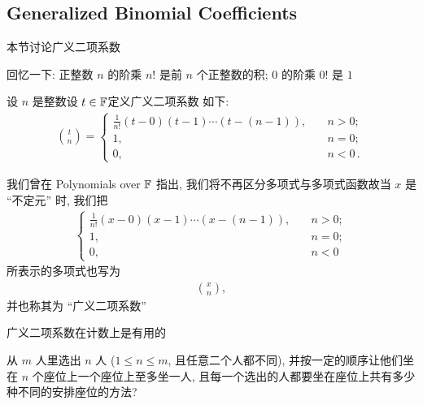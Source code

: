 \subsection*{Generalized Binomial Coefficients}

本节讨论广义二项系数\period

回忆一下: 正整数 $n$ 的阶乘 $n!$ 是前 $n$ 个正整数的积; $0$ 的阶乘 $0!$ 是 $1$\period

\begin{definition}
    设 $n$ 是整数\period 设 $t \in \mathbb{F}$\period 定义广义二项系数  如下:
    \begin{align*}
        \binom{t}{n} = \begin{cases}
            \frac{1}{n!} (t - 0)(t - 1) \cdots (t - (n - 1)), & \quad n > 0;        \\
            1,                                                & \quad n = 0;        \\
            0,                                                & \quad n < 0 \period
        \end{cases}
    \end{align*}
\end{definition}

\begin{remark}
    我们曾在 Polynomials over $\mathbb{F}$ 指出, 我们将不再区分多项式与多项式函数\period 故当 $x$ 是 ``不定元'' 时, 我们把
    \begin{align*}
        \begin{cases}
            \frac{1}{n!} (x - 0)(x - 1) \cdots (x - (n - 1)), & \quad n > 0; \\
            1,                                                & \quad n = 0; \\
            0,                                                & \quad n < 0
        \end{cases}
    \end{align*}
    所表示的多项式也写为
    \begin{align*}
        \binom{x}{n},
    \end{align*}
    并也称其为 ``广义二项系数''\period
\end{remark}

广义二项系数在计数上是有用的\period

从 $m$ 人里选出 $n$ 人 ($1 \leq n \leq m$, 且任意二个人都不同), 并按一定的顺序让他们坐在 $n$ 个座位上\period 一个座位上至多坐一人, 且每一个选出的人都要坐在座位上\period 共有多少种不同的安排座位的方法?

